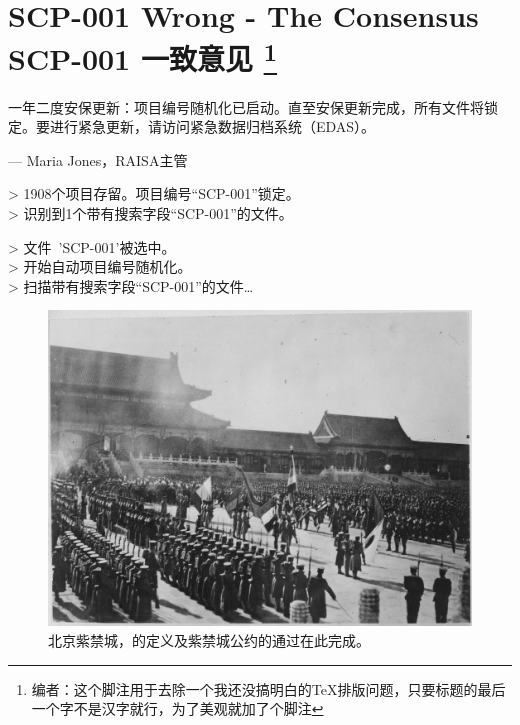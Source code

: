 \chapter[SCP-001 一致意见]{
	SCP-001 Wrong - The Consensus \\
	SCP-001 一致意见
	\footnote{编者\QIS：这个脚注用于去除一个我还没搞明白的\TeX 排版问题，只要标题的最后一个字不是汉字就行，为了美观就加了个脚注\label{foot:fix}}
}

\label{chap:SCP-001.the.consensus}


\begin{scpbox}[colback=ftwoftwoctwo, center upper]


一年二度安保更新：项目编号随机化已启动。直至安保更新完成，所有文件将锁定。要进行紧急更新，请访问紧急数据归档系统（EDAS）。

— Maria Jones，RAISA主管

\end{scpbox}

\hr

\begin{scpboxcmd}

> 1908个项目存留。项目编号“SCP-001”锁定。 \\
> 识别到1个带有搜索字段“SCP-001”的文件。

> 文件~'SCP-001'被选中。 \\
> 开始自动项目编号随机化。 \\
> 扫描带有搜索字段“SCP-001”的文件…

\end{scpboxcmd}

\hr

\begin{figure}[H]
	\centering
	\includegraphics{images/SCP-001-the-consensus.jpg}
	\caption*{北京紫禁城，的定义及紫禁城公约的通过在此完成。}
\end{figure}

